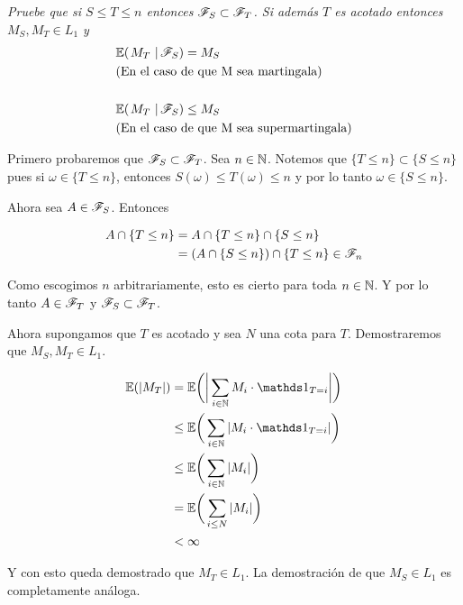 \emph{
	Pruebe que si $S\leq T\leq n$ entonces $\mathscr{F}_S\subset\mathscr{F}_T$. Si además $T$ es acotado entonces $M_S,M_T \in L_1$ y 
	\begin{align}
		&\espc{M_T}{\F_S} = M_S \label{problema1_4:caso_martingala} 			\\
		&\mbox{(En el caso de que M sea martingala)} 
		\\
		\\
		&\espc{M_T}{\F_S}\leq M_S \label{problema1_4:caso_supermartingala}	\\
		&\mbox{(En el caso de que M sea supermartingala)} 
	\end{align}	
}

\afterstatement\par\null

	Primero probaremos que $\mathscr{F}_S \subset \mathscr{F}_T$. Sea $n \in \mathbb{N}$. Notemos que $\{ T \leq n \} \subset \{ S \leq n \}$ pues
	si $\omega \in \{ T \leq n \}$, entonces $S(\omega) \leq T(\omega) \leq n $ y por lo tanto $\omega \in \{ S \leq n \}$.\par\null

	Ahora sea $A \in \mathscr{F}_S$. Entonces

	\begin{align}
		A \cap \{ T \leq n \} 	&=		A  \cap \{ T \leq n \} \cap \{ S \leq n \} \\
								&=		(A  \cap \{ S \leq n \}) \cap \{ T \leq n \} \in \mathscr{F}_n
	\end{align}\par\null

	Como escogimos $n$ arbitrariamente, esto es cierto para toda $n \in \mathbb{N}$. Y por lo tanto $A \in \mathscr{F}_T$ y $\mathscr{F}_S \subset \mathscr{F}_T$.\par\null

	Ahora supongamos que $T$ es acotado y sea $N$ una cota para $T$. Demostraremos que $M_S,M_T \in L_1$.
	
	\begin{align}
		\E(|M_T|) 	&=		\E\bigg(	\bigg| \sum_{i \in \N} M_i \cdot \indic_{T = i} \bigg|	\bigg) \\ 
					&\leq	\E\bigg(	\sum_{i \in \N} |M_i \cdot \indic_{T = i} |				\bigg) \\
					&\leq	\E\bigg(	\sum_{i \in \N} |M_i|									\bigg) \\
					&=		\E\bigg(	\sum_{i \leq N} |M_i|									\bigg) \\
					&< 		\infty
	\end{align}\par\null
	
	Y con esto queda demostrado que $M_T \in L_1$. La demostración de que $M_S \in L_1$ es completamente análoga.\par\null
	
